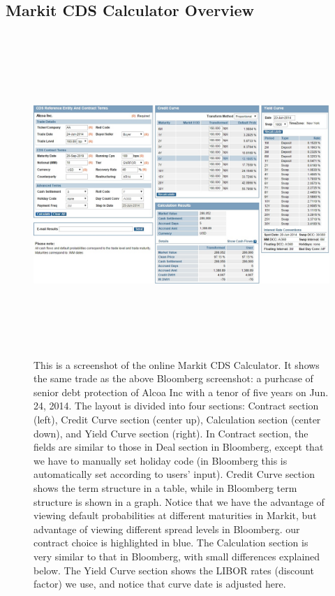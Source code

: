 \documentclass{jss}
\begin{document}
\newpage

\subsection{Markit CDS Calculator Overview}
\label{Markit}

\begin{figure}[H]
\centering
\includegraphics[width=6.3in, height=4.8in]{images/MarkitCDSAlcoa.jpg}
\caption{
This is a screenshot of the online Markit CDS Calculator. It shows the same trade as the above Bloomberg screenshot: a purhcase of senior debt protection of Alcoa Inc with a tenor of five years on Jun. 24, 2014. The layout is divided into four sections: Contract section (left), Credit Curve section (center up), Calculation section (center down), and Yield Curve section (right). In Contract section, the fields are similar to those in Deal section in Bloomberg, except that we have to manually set holiday code (in Bloomberg this is automatically set according to users' input). Credit Curve section shows the term structure in a table, while in Bloomberg term structure is shown in a graph. Notice that we have the advantage of viewing default probabilities at different maturities in Markit, but advantage of viewing different spread levels in Bloomberg. our contract choice is highlighted in blue. The Calculation section is very similar to that in Bloomberg, with small differences explained below. The Yield Curve section shows the LIBOR rates (discount factor) we use, and notice that curve date is adjusted here.
}
\end{figure}
\end{document}
